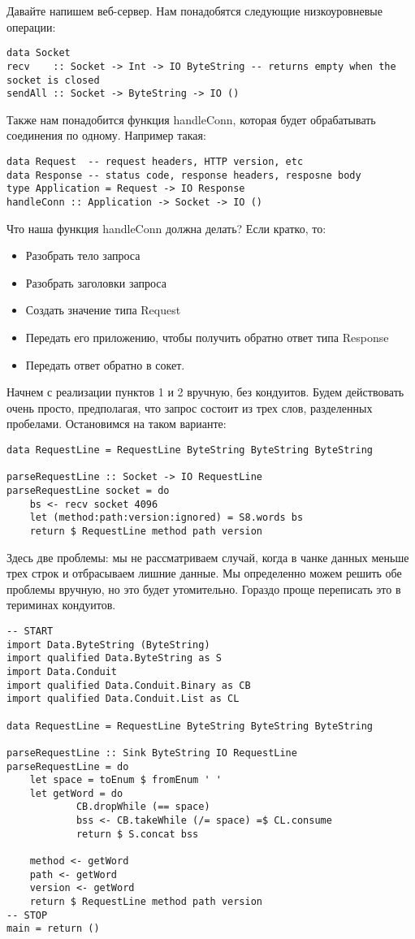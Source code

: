 Давайте напишем веб-сервер. Нам понадобятся следующие низкоуровневые операции:
\begin{lstlisting}
data Socket
recv    :: Socket -> Int -> IO ByteString -- returns empty when the socket is closed
sendAll :: Socket -> ByteString -> IO ()
\end{lstlisting}
Также нам понадобится функция handleConn, которая будет обрабатывать соединения по одному. Например такая:
\begin{lstlisting}
data Request  -- request headers, HTTP version, etc
data Response -- status code, response headers, resposne body
type Application = Request -> IO Response
handleConn :: Application -> Socket -> IO ()
\end{lstlisting}
Что наша функция handleConn должна делать? Если кратко, то:
\begin{itemize}  
\item   Разобрать тело запроса
\item   Разобрать заголовки запроса
\item   Создать значение типа Request
\item   Передать его приложению, чтобы получить обратно ответ типа Response
\item   Передать ответ обратно в сокет.
\end{itemize}  
Начнем с реализации пунктов 1 и 2 вручную, без кондуитов. Будем действовать очень просто, предполагая, что запрос состоит из трех слов, разделенных пробелами. Остановимся на таком варианте:
\begin{lstlisting}
data RequestLine = RequestLine ByteString ByteString ByteString

parseRequestLine :: Socket -> IO RequestLine
parseRequestLine socket = do
    bs <- recv socket 4096
    let (method:path:version:ignored) = S8.words bs
    return $ RequestLine method path version
\end{lstlisting}
Здесь две проблемы: мы не рассматриваем случай, когда в чанке данных меньше трех строк и отбрасываем лишние данные. Мы определенно можем решить обе проблемы вручную, но это будет утомительно. Гораздо проще переписать это в териминах кондуитов.
\begin{lstlisting}
-- START
import Data.ByteString (ByteString)
import qualified Data.ByteString as S
import Data.Conduit
import qualified Data.Conduit.Binary as CB
import qualified Data.Conduit.List as CL

data RequestLine = RequestLine ByteString ByteString ByteString

parseRequestLine :: Sink ByteString IO RequestLine
parseRequestLine = do
    let space = toEnum $ fromEnum ' '
    let getWord = do
            CB.dropWhile (== space)
            bss <- CB.takeWhile (/= space) =$ CL.consume
            return $ S.concat bss

    method <- getWord
    path <- getWord
    version <- getWord
    return $ RequestLine method path version
-- STOP
main = return ()
\end{lstlisting}

